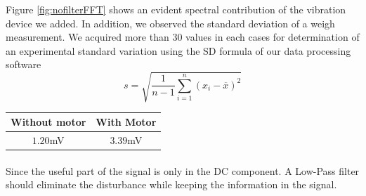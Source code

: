 \documentclass{article}[12pt]
\begin{document}
Figure \ref{fig:nofilterFFT} shows an evident spectral contribution of the vibration device we added. In addition, we observed the standard deviation of a weigh measurement. We acquired more than 30 values in each cases for determination of an experimental standard variation using the SD formula of our data processing software 
\begin{equation}
    s = \sqrt{\frac{1}{n-1} \sum_{i=1}^n (x_i - \overline{x})^2}
\end{equation}
\begin{center}
\begin{tabular}{|c|c|}
    \hline
    Without motor & With Motor \\
    \hline
     $1.20$mV & $3.39$mV \\
    \hline
\end{tabular}
\end{center}
\paragraph{}
Since the useful part of the signal is only in the DC component. A Low-Pass filter should eliminate the disturbance while keeping the information in the signal.
\end{document}
